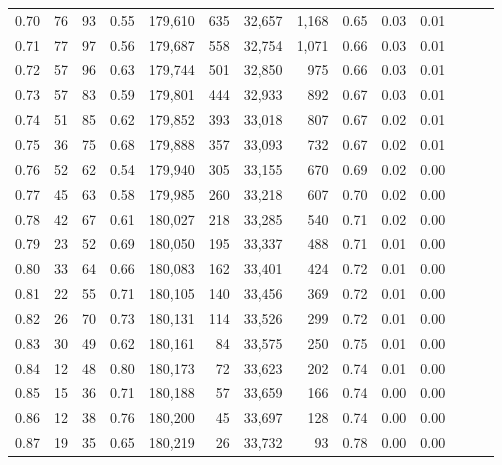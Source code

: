 \begin{tabular}{rrrrrrrrrrrrrr}
0.70 &      76 &     93 &  0.55 &  179,610 &      635 &  32,657 &   1,168 &  0.65 &  0.03 &      0.01 \\
0.71 &      77 &     97 &  0.56 &  179,687 &      558 &  32,754 &   1,071 &  0.66 &  0.03 &      0.01 \\
0.72 &      57 &     96 &  0.63 &  179,744 &      501 &  32,850 &     975 &  0.66 &  0.03 &      0.01 \\
0.73 &      57 &     83 &  0.59 &  179,801 &      444 &  32,933 &     892 &  0.67 &  0.03 &      0.01 \\
0.74 &      51 &     85 &  0.62 &  179,852 &      393 &  33,018 &     807 &  0.67 &  0.02 &      0.01 \\
0.75 &      36 &     75 &  0.68 &  179,888 &      357 &  33,093 &     732 &  0.67 &  0.02 &      0.01 \\
0.76 &      52 &     62 &  0.54 &  179,940 &      305 &  33,155 &     670 &  0.69 &  0.02 &      0.00 \\
0.77 &      45 &     63 &  0.58 &  179,985 &      260 &  33,218 &     607 &  0.70 &  0.02 &      0.00 \\
0.78 &      42 &     67 &  0.61 &  180,027 &      218 &  33,285 &     540 &  0.71 &  0.02 &      0.00 \\
0.79 &      23 &     52 &  0.69 &  180,050 &      195 &  33,337 &     488 &  0.71 &  0.01 &      0.00 \\
0.80 &      33 &     64 &  0.66 &  180,083 &      162 &  33,401 &     424 &  0.72 &  0.01 &      0.00 \\
0.81 &      22 &     55 &  0.71 &  180,105 &      140 &  33,456 &     369 &  0.72 &  0.01 &      0.00 \\
0.82 &      26 &     70 &  0.73 &  180,131 &      114 &  33,526 &     299 &  0.72 &  0.01 &      0.00 \\
0.83 &      30 &     49 &  0.62 &  180,161 &       84 &  33,575 &     250 &  0.75 &  0.01 &      0.00 \\
0.84 &      12 &     48 &  0.80 &  180,173 &       72 &  33,623 &     202 &  0.74 &  0.01 &      0.00 \\
0.85 &      15 &     36 &  0.71 &  180,188 &       57 &  33,659 &     166 &  0.74 &  0.00 &      0.00 \\
0.86 &      12 &     38 &  0.76 &  180,200 &       45 &  33,697 &     128 &  0.74 &  0.00 &      0.00 \\
0.87 &      19 &     35 &  0.65 &  180,219 &       26 &  33,732 &      93 &  0.78 &  0.00 &      0.00 \\

\end{tabular}
